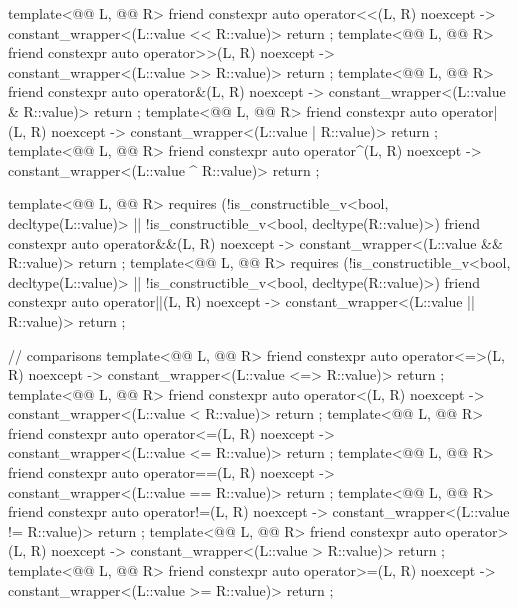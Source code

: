 \begin{codeblock}
{  template<@@ L, @@ R>
    friend constexpr auto operator<<(L, R) noexcept -> constant_wrapper<(L::value << R::value)>
      { return {}; }
  template<@@ L, @@ R>
    friend constexpr auto operator>>(L, R) noexcept -> constant_wrapper<(L::value >> R::value)>
      { return {}; }
  template<@@ L, @@ R>
    friend constexpr auto operator&(L, R) noexcept -> constant_wrapper<(L::value & R::value)>
      { return {}; }
  template<@@ L, @@ R>
    friend constexpr auto operator|(L, R) noexcept -> constant_wrapper<(L::value | R::value)>
      { return {}; }
  template<@@ L, @@ R>
    friend constexpr auto operator^(L, R) noexcept -> constant_wrapper<(L::value ^ R::value)>
      { return {}; }

  template<@@ L, @@ R>
    requires (!is_constructible_v<bool, decltype(L::value)> ||
              !is_constructible_v<bool, decltype(R::value)>)
      friend constexpr auto operator&&(L, R) noexcept -> constant_wrapper<(L::value && R::value)>
        { return {}; }
  template<@@ L, @@ R>
    requires (!is_constructible_v<bool, decltype(L::value)> ||
              !is_constructible_v<bool, decltype(R::value)>)
      friend constexpr auto operator||(L, R) noexcept -> constant_wrapper<(L::value || R::value)>
        { return {}; }

  // comparisons
  template<@@ L, @@ R>
    friend constexpr auto operator<=>(L, R) noexcept -> constant_wrapper<(L::value <=> R::value)>
      { return {}; }
  template<@@ L, @@ R>
    friend constexpr auto operator<(L, R) noexcept -> constant_wrapper<(L::value < R::value)>
      { return {}; }
  template<@@ L, @@ R>
    friend constexpr auto operator<=(L, R) noexcept -> constant_wrapper<(L::value <= R::value)>
      { return {}; }
  template<@@ L, @@ R>
    friend constexpr auto operator==(L, R) noexcept -> constant_wrapper<(L::value == R::value)>
      { return {}; }
  template<@@ L, @@ R>
    friend constexpr auto operator!=(L, R) noexcept -> constant_wrapper<(L::value != R::value)>
      { return {}; }
  template<@@ L, @@ R>
    friend constexpr auto operator>(L, R) noexcept -> constant_wrapper<(L::value > R::value)>
      { return {}; }
  template<@@ L, @@ R>
    friend constexpr auto operator>=(L, R) noexcept -> constant_wrapper<(L::value >= R::value)>
      { return {}; }

}
\end{codeblock}
